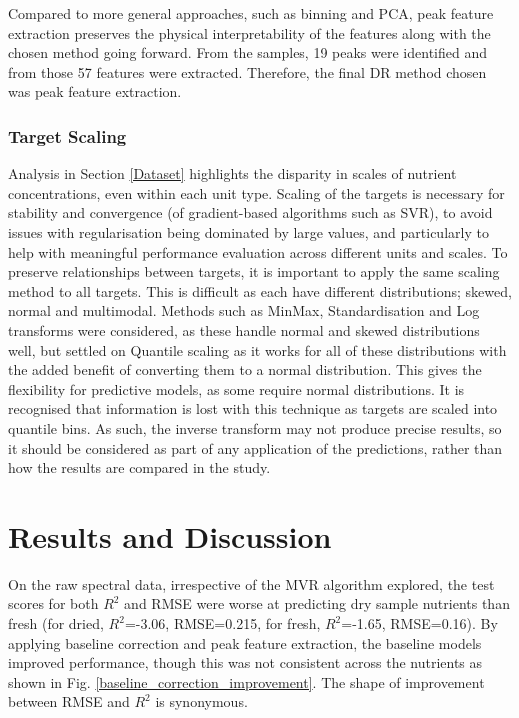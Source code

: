 \documentclass[conference]{IEEEtran}
\begin{document}
Compared to more general approaches, such as binning and PCA, peak feature extraction preserves the physical interpretability of the features along with the chosen method going forward. From the samples, 19 peaks were identified and from those 57 features were extracted. Therefore, the final DR method chosen was peak feature extraction.

\subsubsection{Target Scaling}\label{target_scaling}
Analysis in Section \ref{Dataset} highlights the disparity in scales of nutrient concentrations, even within each unit type. Scaling of the targets is necessary for stability and convergence (of gradient-based algorithms such as SVR), to avoid issues with regularisation being dominated by large values, and particularly to help with meaningful performance evaluation across different units and scales. To preserve relationships between targets, it is important to apply the same scaling method to all targets. This is difficult as each have different distributions; skewed, normal and multimodal. Methods such as MinMax, Standardisation and Log transforms were considered, as these handle normal and skewed distributions well, but settled on Quantile scaling as it works for all of these distributions with the added benefit of converting them to a normal distribution. This gives the flexibility for predictive models, as some require normal distributions. It is recognised that information is lost with this technique as targets are scaled into quantile bins. As such, the inverse transform may not produce precise results, so it should be considered as part of any application of the predictions, rather than how the results are compared in the study.

\section{Results and Discussion}
On the raw spectral data, irrespective of the MVR algorithm explored, the test scores for both $R^2$ and RMSE were worse at predicting dry sample nutrients than fresh (for dried, $R^2$=-3.06, RMSE=0.215, for fresh, $R^2$=-1.65, RMSE=0.16). By applying baseline correction and peak feature extraction, the baseline models improved performance, though this was not consistent across the nutrients as shown in Fig. \ref{baseline_correction_improvement}. The shape of improvement between RMSE and $R^2$ is synonymous.
\end{document}
